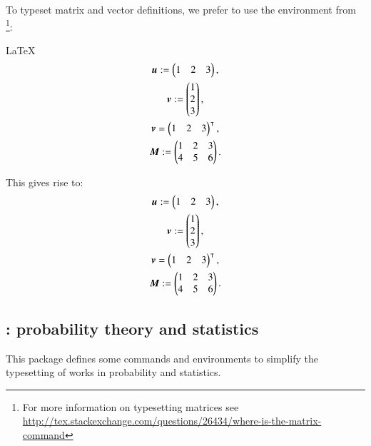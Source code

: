 {{To typeset matrix and vector definitions, we prefer to use the  environment from \footnote{For more information on typesetting matrices see \url{http://tex.stackexchange.com/questions/26434/where-is-the-matrix-command}}:
\begin{snippet}{LaTeX}
\begin{gather*}
\boldsymbol{u} := \begin{pmatrix} 1 & 2 & 3 \end{pmatrix}, \\
\boldsymbol{v} := \begin{pmatrix} 1 \\ 2 \\ 3 \end{pmatrix}, \\
\boldsymbol{v} = \begin{pmatrix} 1 & 2 & 3 \end{pmatrix}^{\intercal}, \\
\boldsymbol{M} := \begin{pmatrix} 1 & 2 & 3 \\ 4 & 5 & 6 \end{pmatrix}.
\end{gather*}
\end{snippet}
This gives rise to:
\begin{gather*}
\boldsymbol{u} := \begin{pmatrix} 1 & 2 & 3 \end{pmatrix}, \\
\boldsymbol{v} := \begin{pmatrix} 1 \\ 2 \\ 3 \end{pmatrix}, \\
\boldsymbol{v} = \begin{pmatrix} 1 & 2 & 3 \end{pmatrix}^{\intercal}, \\
\boldsymbol{M} := \begin{pmatrix} 1 & 2 & 3 \\ 4 & 5 & 6 \end{pmatrix}.
\end{gather*}

\subsection{: probability theory and statistics}

This package defines some commands and environments to simplify the typesetting of works in probability and statistics.

}}
